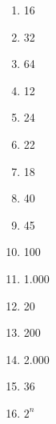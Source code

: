 \documentclass[12pt]{report}
\newcommand{\1}{\faThermometerEmpty}
\newcommand{\2}{\faThermometerQuarter}
\newcommand{\3}{\faThermometerHalf}
\newcommand{\4}{\faThermometerThreeQuarters}
\newcommand{\5}{\faThermometerFull}
\begin{document}
\begin{enumerate}
\begin{multicols}{4}
  \begin{enumerate}
    \item  16
    \item  32
    \item  64
    \item  12
    \item  24
    \item  22
    \item  18
    \item  40
    \item  45
    \item  100
    \item  1.000
    \item  20
    \item  200
    \item  2.000
    \item  36
    \item  $2^n$
    \end{enumerate}

\end{multicols}

\end{enumerate}
\end{document}
